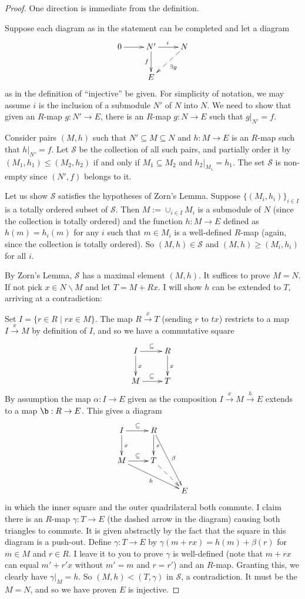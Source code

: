 \documentclass{amsart}[12pt]
\def\a{\alpha}
\def\cS{\mathcal S}
\numberwithin{equation}{section}
\theoremstyle{plain} %
\theoremstyle{definition}
\theoremstyle{remark}
\newcommand{\xra}[1]{\xrightarrow{#1}}
\begin{document}
\begin{proof} One direction is immediate from the definition.

  Suppose each diagram as in the statement can be completed and let a diagram
$$
\xymatrix{
0 \ar[r] & N' \ar[d]_-f \ar[r]^i & N \ar@{-->}[dl]^{\exists g} \\ 
& E \\
}
$$
as in the definition of ``injective'' be given. 
For simplicity of notation, we may assume $i$ is the inclusion of a submodule $N'$ of $N$ into $N$. We need to show that given
an $R$-map $g: N' \to E$,  there is an $R$-map
$g: N \to E$ such that $g|_{N'} = f$.

Consider pairs $(M,h)$ such that $N' \subseteq M \subseteq N$ and $h: M \to E$ is an $R$-map 
such that $h|_{N'} = f$. Let $\cS$ be the collection of all such pairs, 
and partially order it by $(M_1, h_1) \leq (M_2, h_2)$ if and only if $M_1 \subseteq M_2$ and $h_2|_{M_1} = h_1$. 
The set $\cS$ is non-empty since $(N', f)$ belongs to it. 

Let us show $\cS$ satisfies the hypotheses of Zorn's Lemma. Suppose $\{(M_i, h_i)\}_{i \in I}$ is a totally ordered subset of $\cS$. Then $M := \cup_{i \in I} M_i$ is a 
submodule of $N$ (since the collection is totally ordered) and the function $h: M \to E$ defined as $h(m) = h_i(m)$ for any $i$ such that $m \in M_i$ is a well-defined
$R$-map (again, since the collection is totally ordered). So $(M,h) \in \cS$ and $(M,h) \geq (M_i, h_i)$ for all $i$. 

By Zorn's Lemma, $\cS$ has a maximal element $(M, h)$. It suffices to prove $M = N$. If not pick $x \in N \smallsetminus M$ and let $T = M + Rx$. I will show $h$ 
can be extended to $T$, arriving at a contradiction:

Set $I = \{r \in R \mid rx \in M\}$. The map $R \xra{x} T$ (sending $r$ to $tx$) restricts to a map $I \xra{x} M$ by definition of $I$, and so we have a commutative
square
$$
\xymatrix{
  I \ar[r]^{\subseteq} \ar[d]^x & R \ar[d]^x \\
  M \ar[r]^{\subseteq} & T \\
}
$$
By assumption the map $\a: I \to E$ given as the composition $I \xra{x} M \xra{h} E$ extends to a map
$\b: R \to E$. This gives a diagram
$$
\xymatrix{
  I \ar[r]^{\subseteq} \ar[d]^x & R \ar[d]^x \ar[rdd]^\beta \\
  M \ar[r]^{\subseteq} \ar[rrd]_{h} & T \ar@{-->}[rd] \\
  && E
}
$$
in which the inner square and the outer quadrilateral both commute.
I claim there is an $R$-map $\gamma: T \to E$ (the dashed arrow in the diagram) causing both triangles to commute. It is given abstractly by the fact that the square in this
diagram is a push-out. 
Define $\gamma: T \to E$ by $\gamma(m + rx) = h(m) + \beta(r)$ for $m \in M$ and $r \in R$.  
I leave it to you to prove $\gamma$ is well-defined (note that $m + rx$ can equal $m' + r'x$ without $m' = m$
and $r = r'$) and an $R$-map. Granting this, we clearly have $\gamma|_M = h$. So $(M,h) < (T, \gamma)$ in $\cS$,  a contradiction. It must be the $M = N$, and 
so we have proven $E$ is injective. 
\end{proof}
\end{document}

